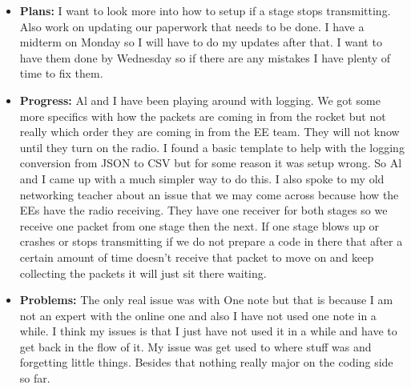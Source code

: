 \documentclass[10pt,draftclsnofoot,onecolumn]{IEEEtran}
\begin{document}
\begin{itemize}
	\item \textbf{Plans: }
	I want to look more into how to setup if a stage stops transmitting. Also work on updating our paperwork that needs to be done. I have a midterm on Monday so I will have to do my updates after that. I want to have them done by Wednesday so if there are any mistakes I have plenty of time to fix them.
	\item \textbf{Progress: }
	Al and I have been playing around with logging. We got some more specifics with how the packets are coming in from the rocket but not really which order they are coming in from the EE team. They will not know until they turn on the radio. I found a basic template to help with the logging conversion from JSON to CSV but for some reason it was setup wrong. So Al and I came up with a much simpler way to do this. I also spoke to my old networking teacher about an issue that we may come across because how the EEs have the radio receiving. They have one receiver for both stages so we receive one packet from one stage then the next. If one stage blows up or crashes or stops transmitting if we do not prepare a code in there that after a certain amount of time doesn't receive that packet to move on and keep collecting the packets it will just sit there waiting.
	\item \textbf{Problems: }
	The only real issue was with One note but that is because I am not an expert with the online one and also I have not used one note in a while. I think my issues is that I just have not used it in a while and have to get back in the flow of it. My issue was get used to where stuff was and forgetting little things. Besides that nothing really major on the coding side so far.
\end{itemize}
\end{document}
